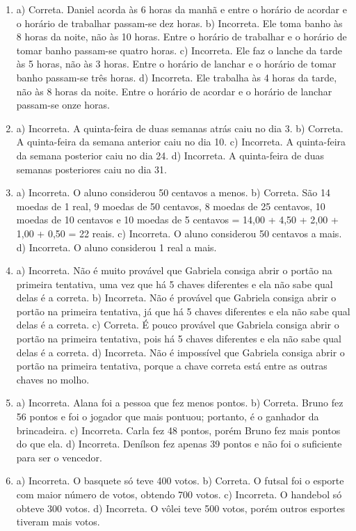 \begin{enumerate}
\item
a) Correta. Daniel acorda às 6 horas da manhã e entre o horário de acordar e o horário de trabalhar passam-se dez horas.
b) Incorreta. Ele toma banho às 8 horas da noite, não às 10 horas. Entre o horário de trabalhar e o horário de tomar banho passam-se quatro horas.
c) Incorreta. Ele faz o lanche da tarde às 5 horas, não às 3 horas. Entre o horário de lanchar e o horário de tomar banho passam-se três horas.
d) Incorreta. Ele trabalha às 4 horas da tarde, não às 8 horas da noite. Entre o horário de acordar e o horário de lanchar passam-se onze horas.

\item
a) Incorreta. A quinta-feira de duas semanas atrás caiu no dia 3.
b) Correta. A quinta-feira da semana anterior caiu no dia 10.
c) Incorreta. A quinta-feira da semana posterior caiu no dia 24.
d) Incorreta. A quinta-feira de duas semanas posteriores caiu no dia 31.

\item
a) Incorreta. O aluno considerou 50 centavos a menos.
b) Correta. São 14 moedas de 1 real, 9 moedas de 50 centavos, 8 moedas
de 25 centavos, 10 moedas de 10 centavos e 10 moedas de 5 centavos =
14,00 + 4,50 + 2,00 + 1,00 + 0,50 = 22 reais.
c) Incorreta. O aluno considerou 50 centavos a mais.
d) Incorreta. O aluno considerou 1 real a mais.

\item
a) Incorreta. Não é muito provável que Gabriela consiga abrir o portão
na primeira tentativa, uma vez que há 5 chaves diferentes e ela não sabe
qual delas é a correta.
b) Incorreta. Não é provável que Gabriela consiga abrir o portão na
primeira tentativa, já que há 5 chaves diferentes e ela não sabe qual
delas é a correta.
c) Correta. É pouco provável que Gabriela consiga abrir o portão na
primeira tentativa, pois há 5 chaves diferentes e ela não sabe qual
delas é a correta.
d) Incorreta. Não é impossível que Gabriela consiga abrir o portão na
primeira tentativa, porque a chave correta está entre as outras chaves
no molho.

\item
a) Incorreta. Alana foi a pessoa que fez menos pontos.
b) Correta. Bruno fez 56 pontos e foi o jogador que mais pontuou;
portanto, é o ganhador da brincadeira.
c) Incorreta. Carla fez 48 pontos, porém Bruno fez mais pontos do que ela.
d) Incorreta. Denílson fez apenas 39 pontos e não foi o suficiente para ser o vencedor.

\item
a) Incorreta. O basquete só teve 400 votos.
b) Correta. O futsal foi o esporte com maior número de votos, obtendo 700 votos.
c) Incorreta. O handebol só obteve 300 votos.
d) Incorreta. O vôlei teve 500 votos, porém outros esportes tiveram mais votos.


\end{enumerate}
